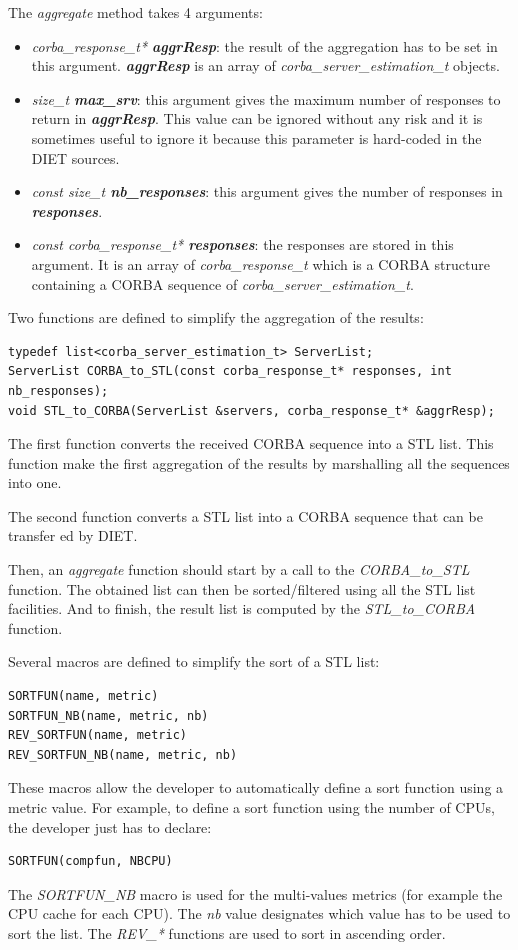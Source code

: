 \noindent The \textit{aggregate} method takes 4 arguments:
\begin{itemize}
  \item \textit{corba\_response\_t* \bf aggrResp}: the result of the aggregation
    has to be set in this argument. \textit{\bf aggrResp} is an array of
    \textit{corba\_server\_estimation\_t} objects. 
  \item \textit{size\_t \bf max\_srv}: this argument gives the maximum number
    of responses to return in \textit{\bf aggrResp}. This value can be ignored
    without any risk and it is sometimes useful to ignore it because this
    parameter is hard-coded in the DIET sources.
  \item \textit{const size\_t \bf nb\_responses}: this argument gives the number
    of responses in \textit{\bf responses}.
  \item \textit{const corba\_response\_t* \bf responses}: the responses are
    stored in this argument. It is an array of \textit{corba\_response\_t}
    which is a CORBA structure containing a CORBA sequence of
    \textit{corba\_server\_estimation\_t}.
\end{itemize}

\noindent Two functions are defined to simplify the aggregation of the results:
\begin{verbatim}
typedef list<corba_server_estimation_t> ServerList;
ServerList CORBA_to_STL(const corba_response_t* responses, int nb_responses);
void STL_to_CORBA(ServerList &servers, corba_response_t* &aggrResp);
\end{verbatim}
The first function converts the received CORBA sequence into a STL list. This
function make the first aggregation of the results by marshalling all the
sequences into one.

\noindent The second function converts a STL list into a CORBA sequence that
can be transfer ed by DIET.

Then, an \textit{aggregate} function should start by a call to the
\textit{CORBA\_to\_STL} function. The obtained list can then be sorted/filtered
using all the STL list facilities. And to finish, the result list is computed
by the \textit{STL\_to\_CORBA} function.

Several macros are defined to simplify the
sort of a STL list:
\begin{verbatim}
SORTFUN(name, metric)
SORTFUN_NB(name, metric, nb)
REV_SORTFUN(name, metric)
REV_SORTFUN_NB(name, metric, nb)
\end{verbatim}
These macros allow the developer to automatically define a sort function
using a metric value. For example, to define a sort function using the
number of CPUs, the developer just has to declare:
\begin{verbatim}
SORTFUN(compfun, NBCPU)
\end{verbatim}
The \textit{SORTFUN\_NB} macro is used for the multi-values metrics (for
example the CPU cache for each CPU). The \textit{nb} value designates which
value has to be used to sort the list.
The \textit{REV\_*} functions are used to sort in ascending order.


